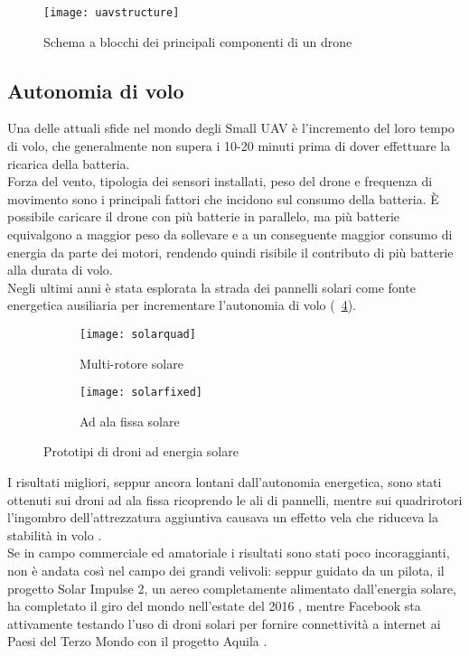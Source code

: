 \begin{figure}
	\begin{center}
		\texttt{[image: uavstructure]}
	\end{center}
	\caption{Schema a blocchi dei principali componenti di un drone} \label{fig:uavstructure}
\end{figure}

\subsection[Autonomia di volo]{Autonomia di volo} \label{sect:autonomia}
Una delle attuali sfide nel mondo degli Small UAV è l'incremento del loro tempo di volo, che generalmente non supera i 10-20 minuti prima di dover effettuare la ricarica della batteria. \\
Forza del vento, tipologia dei sensori installati, peso del drone e frequenza di movimento sono i principali fattori che incidono sul consumo della batteria. 
È possibile caricare il drone con più batterie in parallelo, ma più batterie equivalgono a maggior peso da sollevare e a un conseguente maggior consumo di energia da parte dei motori, rendendo quindi risibile il contributo di più batterie alla durata di volo.\\
Negli ultimi anni è stata esplorata la strada dei pannelli solari come fonte energetica ausiliaria per incrementare l'autonomia di volo (\figurename\ \ref{fig:solar}). 

\begin{figure}
	\centering
	\begin{subfigure}[b]{0.4\textwidth}
		\centering
		\texttt{[image: solarquad]}
		\caption{Multi-rotore solare}
		\label{fig:solarquad}
	\end{subfigure}
	\begin{subfigure}[b]{0.4\textwidth}
		\centering
		\texttt{[image: solarfixed]}
		\caption{Ad ala fissa solare}
		\label{fig:solarfixed}
	\end{subfigure}
	\caption{Prototipi di droni ad energia solare}
	\label{fig:solar}
\end{figure}


I risultati migliori, seppur ancora lontani dall'autonomia energetica, sono stati ottenuti sui droni ad ala fissa \cite{newatlas} ricoprendo le ali di pannelli, mentre sui quadrirotori l'ingombro dell'attrezzatura aggiuntiva causava un effetto vela che riduceva la stabilità in volo \cite{diydrones}.\\ Se in campo commerciale ed amatoriale i risultati sono stati poco incoraggianti, non è andata così nel campo dei grandi velivoli: seppur guidato da un pilota, il progetto Solar Impulse 2, un aereo completamente alimentato dall'energia solare, ha completato il giro del mondo nell'estate del 2016 \cite{theguardian}, mentre Facebook sta attivamente testando l'uso di droni solari per fornire connettività a internet ai Paesi del Terzo Mondo con il progetto Aquila \cite{fbaquila}.\\

